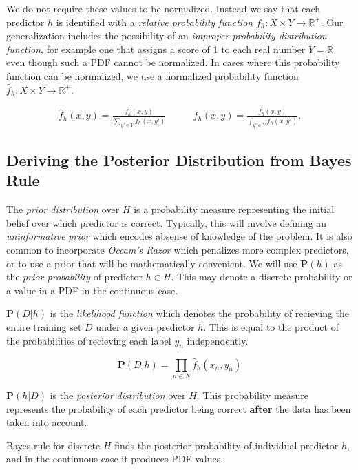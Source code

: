 \documentclass[twoside]{article}
\begin{document}
We do not require these values to be normalized. Instead we say that each predictor \(h\) is identified with a \textit{relative probability function} \(f_h: X \times Y \rightarrow \mathbb{R}^+\). Our generalization includes the possibility of an \textit{improper probability distribution function}, for example one that assigns a score of 1 to each real number \(Y=\mathbb{R}\) even though such a PDF cannot be normalized. In cases where this probability function can be normalized, we use a normalized probability function \(\hat{f}_h: X \times Y \rightarrow \mathbb{R}^+\).

\begin{align}
\label{eq:normalized_probability_model}
\hat{f}_h(x, y)=\frac{f_h(x, y)}{\sum_{y' \in Y} f_h(x,y')} &
\qquad\hat{f}_h(x, y)=\frac{f_h(x, y)}{\int_{y' \in Y} f_h(x,y')}.
\end{align}

\subsection{Deriving the Posterior Distribution from Bayes Rule}

The \textit{prior distribution} over \(H\) is a probability measure representing the initial belief over which predictor is correct. Typically, this will involve defining an \textit{uninformative prior} which encodes absense of knowledge of the problem. It is also common to incorporate \textit{Occam's Razor} which penalizes more complex predictors, or to use a prior that will be mathematically convenient. We will use \(\mathbf{P}(h)\) as the \textit{prior probability} of predictor \(h \in H\). This may denote a discrete probability or a value in a PDF in the continuous case.

\(\mathbf{P}(D|h)\) is the \textit{likelihood function} which denotes the probability of recieving the entire training set \(D\) under a given predictor \(h\). This is equal to the product of the probabilities of recieving each label \(y_n\) independently.

\begin{equation}
\mathbf{P}(D|h)=\prod_{n \in N} \hat{f}_h(x_n,y_n)
\end{equation}

\(\mathbf{P}(h|D)\) is the \textit{posterior distribution} over \(H\). This probability measure represents the probability of each predictor being correct \textbf{after} the data has been taken into account.

Bayes rule for discrete \(H\) finds the posterior probability of individual predictor \(h\), and in the continuous case it produces PDF values.
\end{document}
